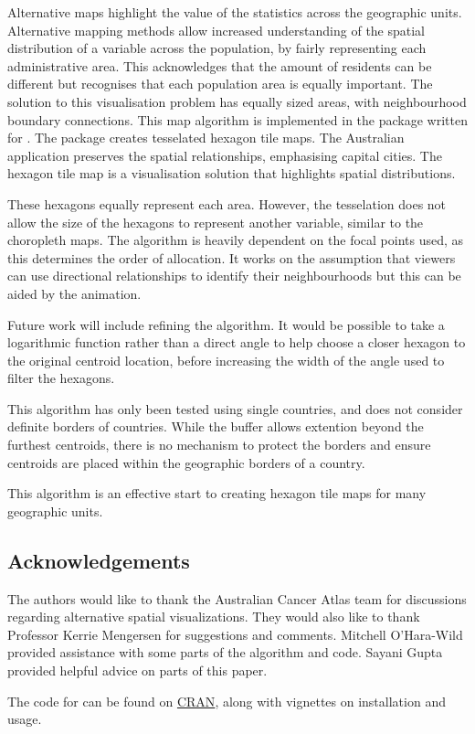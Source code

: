 \documentclass[
]{jss}
\begin{document}
Alternative maps highlight the value of the statistics across the
geographic units. Alternative mapping methods allow increased
understanding of the spatial distribution of a variable across the
population, by fairly representing each administrative area. This
acknowledges that the amount of residents can be different but
recognises that each population area is equally important. The solution
to this visualisation problem has equally sized areas, with
neighbourhood boundary connections. This map algorithm is implemented in
the  \citet{sugarbag} package written for 
\citet{R}. The  package creates tesselated hexagon tile
maps. The Australian application preserves the spatial relationships,
emphasising capital cities. The hexagon tile map is a visualisation
solution that highlights spatial distributions.

These hexagons equally represent each area. However, the tesselation
does not allow the size of the hexagons to represent another variable,
similar to the choropleth maps. The algorithm is heavily dependent on
the focal points used, as this determines the order of allocation. It
works on the assumption that viewers can use directional relationships
to identify their neighbourhoods but this can be aided by the animation.

Future work will include refining the algorithm. It would be possible to
take a logarithmic function rather than a direct angle to help choose a
closer hexagon to the original centroid location, before increasing the
width of the angle used to filter the hexagons.

This algorithm has only been tested using single countries, and does not
consider definite borders of countries. While the buffer allows
extention beyond the furthest centroids, there is no mechanism to
protect the borders and ensure centroids are placed within the
geographic borders of a country.

This algorithm is an effective start to creating hexagon tile maps for
many geographic units.

\hypertarget{acknowledgements}{%
\subsection{Acknowledgements}\label{acknowledgements}}

The authors would like to thank the Australian Cancer Atlas team for
discussions regarding alternative spatial visualizations. They would
also like to thank Professor Kerrie Mengersen for suggestions and
comments. Mitchell O'Hara-Wild provided assistance with some parts of
the algorithm and code. Sayani Gupta provided helpful advice on parts of
this paper.

The code for  \citep{sugarbag} can be found on
\href{https://cran.r-project.org/web/packages/sugarbag/index.html}{CRAN},
along with vignettes on installation and usage.


\end{document}
